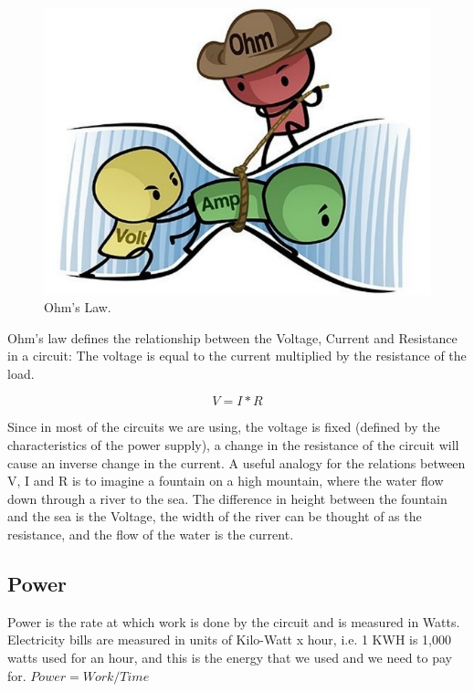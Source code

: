 \begin{figure}[!ht]
	\centering
	\includegraphics{images/ohms_law_cartoon.png}
	\caption{Ohm's Law.} \label{fig:ohms_law_cartoon}
\end{figure}

Ohm's law defines the relationship between the Voltage, Current and Resistance
in a circuit: The voltage is equal to the current multiplied by the resistance
of the load. 

\begin{displaymath}\label{eq:ohm}
    V=I*R
\end{displaymath}

Since in most of the circuits we are using, the voltage is fixed (defined by the
characteristics of the power supply), a change in the resistance of the circuit
will cause an inverse change in the current. A useful
analogy for the relations between V, I and R is to imagine a fountain on a high
mountain, where the water flow down through a river to the sea. The difference
in height between the fountain and the sea is the Voltage, the width of the
river can be thought of as the resistance, and the flow of the water is the
current.

\subsection{Power}

Power is the rate at which work is done by the circuit and is measured in Watts.
Electricity bills are measured in units of Kilo-Watt x hour, i.e. 1 KWH is 1,000 watts used
for an hour, and this is the energy that we used and we need to pay for. $Power
= Work / Time$

